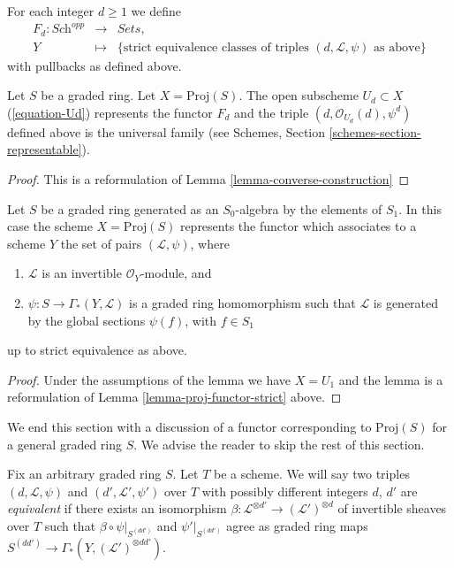 \medskip\noindent
For each integer $d \geq 1$ we define
\begin{eqnarray*}
F_d : \textit{Sch}^{opp} & \longrightarrow & \textit{Sets}, \\
Y & \longmapsto &
\{\text{strict equivalence classes of triples }
(d, \mathcal{L}, \psi)
\text{ as above}\}
\end{eqnarray*}
with pullbacks as defined above.

\begin{lemma}
\label{lemma-proj-functor-strict}
Let $S$ be a graded ring.
Let $X = \text{Proj}(S)$.
The open subscheme $U_d \subset X$ (\ref{equation-Ud}) represents the
functor $F_d$ and the triple $(d, \mathcal{O}_{U_d}(d), \psi^d)$
defined above is the universal family (see
Schemes, Section \ref{schemes-section-representable}).
\end{lemma}

\begin{proof}
This is a reformulation of Lemma \ref{lemma-converse-construction}
\end{proof}

\begin{lemma}
\label{lemma-apply}
Let $S$ be a graded ring generated as an $S_0$-algebra by
the elements of $S_1$. In this case the scheme $X = \text{Proj}(S)$
represents the functor which associates to a scheme
$Y$ the set of pairs $(\mathcal{L}, \psi)$, where
\begin{enumerate}
\item $\mathcal{L}$ is an invertible $\mathcal{O}_Y$-module, and
\item $\psi : S \to \Gamma_*(Y, \mathcal{L})$ is a graded
ring homomorphism such that $\mathcal{L}$ is generated by
the global sections $\psi(f)$, with $f \in S_1$
\end{enumerate}
up to strict equivalence as above.
\end{lemma}

\begin{proof}
Under the assumptions of the lemma we have $X = U_1$ and the
lemma is a reformulation of Lemma \ref{lemma-proj-functor-strict} above.
\end{proof}

\noindent
We end this section with a discussion of a functor corresponding
to $\text{Proj}(S)$ for a general graded ring $S$.
We advise the reader to skip the rest of this section.

\medskip\noindent
Fix an arbitrary graded ring $S$. Let $T$ be a scheme.
We will say two triples $(d, \mathcal{L}, \psi)$ and
$(d', \mathcal{L}', \psi')$ over $T$ with possibly different integers
$d$, $d'$ are {\it equivalent} if there exists
an isomorphism
$\beta : \mathcal{L}^{\otimes d'} \to (\mathcal{L}')^{\otimes d}$
of invertible sheaves over $T$
such that $\beta \circ \psi|_{S^{(dd')}}$ and $\psi'|_{S^{(dd')}}$ agree
as graded ring maps $S^{(dd')} \to \Gamma_*(Y, (\mathcal{L}')^{\otimes dd'})$.

